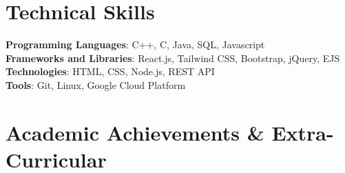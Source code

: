\documentclass[letterpaper,11pt]{article}
\makeatletter
\newcommand{\resumeItem}[1]{
  \item\small{
    {#1 \vspace{-2pt}}
  }
}
\newcommand{\resumeProjectHeading}[2]{
    \item
    \begin{tabular*}{0.97\textwidth}{l@{\extracolsep{\fill}}r}
      \small#1 & #2 \\
    \end{tabular*}\vspace{-7pt}
}
\newcommand{\resumeSubHeadingListStart}{\begin{itemize}[leftmargin=0.15in, label={}]}
\newcommand{\resumeSubHeadingListEnd}{\end{itemize}}
\newcommand{\resumeItemListStart}{\begin{itemize}}
\newcommand{\resumeItemListEnd}{\end{itemize}\vspace{-5pt}}
\makeatother
\begin{document}
\section{Technical Skills}
 \begin{itemize}[leftmargin=0.15in, label={}]
    \small{\item{
     \textbf{Programming Languages}{: C++, C, Java, SQL, Javascript} \\
     \textbf{Frameworks and Libraries}{: React.js, Tailwind CSS, Bootstrap, jQuery, EJS} \\
     \textbf{Technologies}{: HTML, CSS, Node.js, REST API}\\
     \textbf{Tools}{: Git, Linux, Google Cloud Platform}
    }}
 \end{itemize}


          
    



\section{Academic Achievements \& Extra-Curricular}
\end{document}

